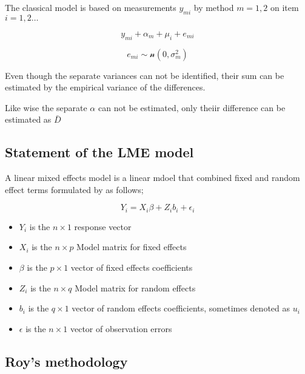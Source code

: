 \documentclass[12pt, a4paper]{report}
\theoremstyle{plain}
\theoremstyle{definition}
\theoremstyle{remark}
\begin{document}
The classical model is based on measurements $y_{mi}$
by method $m=1,2$ on item $i = 1,2 \ldots$

\[y_{mi} + \alpha_{m} + \mu_{i} + e_{mi}\]

\[e_{mi} \sim \mathcal{n} (0,\sigma^2_m)\]

Even though the separate variances can not be
identified, their sum can be estimated by the empirical variance of the differences.

Like wise the separate $\alpha$ can not be
estimated, only theiir difference can be estimated as
$\bar{D}$


\subsection{Statement of the LME model}

A linear mixed effects model is a linear mdoel that combined fixed and random effect terms formulated by \citet{LW82} as follows;

\begin{displaymath}
Y_{i} =X_{i}\beta + Z_{i}b_{i} + \epsilon_{i}
\end{displaymath}
\begin{itemize}
	
	\item $Y_{i}$ is the $n \times 1$ response vector \item $X_{i}$ is
	the $n \times p$ Model matrix for fixed effects \item $\beta$ is
	the $p \times 1$ vector of fixed effects coefficients \item
	$Z_{i}$ is the $n \times q$ Model matrix for random effects \item
	$b_{i}$ is the $q \times 1$ vector of random effects coefficients,
	sometimes denoted as $u_{i}$ \item $\epsilon$ is the $n \times 1$
	vector of observation errors
\end{itemize}



\newpage
\subsection{Roy's methodology}

\end{document}
